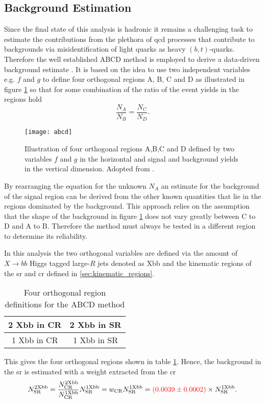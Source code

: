 \subsection{Background Estimation}\label{sec:abcd}
Since the final state of this analysis is hadronic it remains a challenging task to estimate the contributions from the plethora of \ac{qcd} processes that contribute to backgrounds via  misidentification of light quarks as heavy $(b, t)$-quarks. Therefore the well established ABCD method is employed to derive a data-driven background estimate \citep{buttinger2018background,PhysRevD.103.035021}. It is based on the idea to use two independent variables e.g. $f$ and $g$ to define four orthogonal regions A, B, C and D as illustrated in figure \ref{fig:abcd} so that for some combination of the ratio of the event yields in the regions hold
\begin{equation}
    \frac{N_A}{N_B}=\frac{N_C}{N_D}.
\end{equation}
\begin{figure}
    \centering
    \texttt{[image: abcd]}
    \caption[]{Illustration of four orthogonal regions A,B,C and D defined by two variables $f$ and $g$ in the horizontal and signal and background yields in the vertical dimension. Adopted from \citep{PhysRevD.103.035021}.}
    \label{fig:abcd}
\end{figure}
By rearranging the equation for the unknown $N_A$ an estimate for the background of the signal region can be derived from the other known quantities that lie in the regions dominated by the background. This approach relies on the assumption that the shape of the background in figure \ref{fig:abcd} does not vary greatly between C to D and A to B. Therefore the method must always be tested in a different region to determine its reliability.


In this analysis the two orthogonal variables are defined via the amount of $X\rightarrow bb$ Higgs tagged large-$R$ jets denoted as Xbb and the kinematic regions of the \ac{sr} and \ac{cr} defined in \ref{sec:kinematic_regions}.
\begin{table}[htbp]
    \centering
    \caption{Four orthogonal region definitions for the ABCD method}
    \begin{tabular}{|c|c|}
        \hline
        2 Xbb in CR & 2 Xbb in SR \\ \hline
        1 Xbb in CR & 1 Xbb in SR \\ \hline
    \end{tabular}
    \label{tab:abcd}
\end{table}
This gives the four orthogonal regions shown in table \ref{tab:abcd}. Hence, the background in the \ac{sr} is estimated with a weight extracted from the \ac{cr}
\begin{equation}
    N_\text{SR}^\text{2Xbb}=\frac{N_\text{CR}^\text{2Xbb}}{N_\text{CR}^\text{1Xbb}} N_\text{SR}^\text{1Xbb} = w_\text{CR} N_\text{SR}^\text{1Xbb}=  \textcolor{red}{(0.0039 \pm 0.0002)} \times N_\text{SR}^\text{1Xbb}.
\end{equation}


